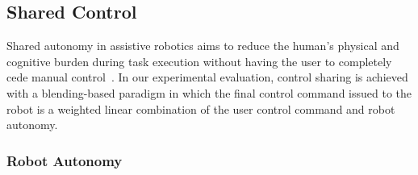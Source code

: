 \documentclass[conference]{IEEEtran}
\begin{document}
\subsection{Shared Control}\label{ssec:shared-control}
Shared autonomy in assistive robotics aims to reduce the human's physical and cognitive burden during task execution without having the user to completely cede manual control~\citep{kim2012autonomy, muelling2017autonomy}. 
In our experimental evaluation, control sharing is achieved with a blending-based paradigm in which the final control command issued to the robot is a weighted linear combination of the user control command and robot autonomy.
\subsubsection{Robot Autonomy}\label{sssec:autonomy}
\end{document}
